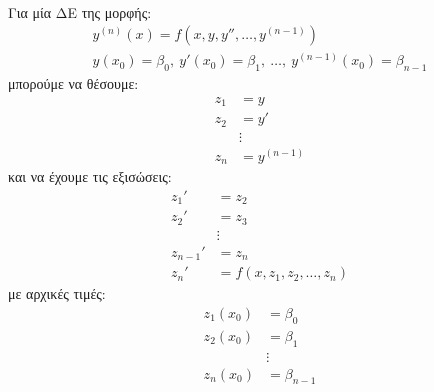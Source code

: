 \documentclass[11pt,a4paper,notitlepage,fleqn,final]{article}
\begin{document}
\paragraph{}
Για μία ΔΕ της μορφής:
\begin{gather*}
	y^{(n)}(x) = f\left(x,y,y'',\dots,y^{(n-1)}\right) \\
	y(x_0) = \beta_0,\ y'(x_0)=\beta_1,\ \dots,\ y^{(n-1)}(x_0)=
	\beta_{n-1}
\end{gather*}
μπορούμε να θέσουμε:
\begin{align*}
	z_1 &= y \\
	z_2 &= y' \\
	&\vdots \\
	z_n &= y^{(n-1)}
\end{align*}
και να έχουμε τις εξισώσεις:
\begin{align*}
	z_1' &= z_2 \\
	z_2' &= z_3 \\
	&\vdots \\
	z_{n-1}' &= z_n \\[3ex]
	z_n' &= f(x,z_1,z_2,\dots,z_n)
\end{align*}
με αρχικές τιμές:
\begin{align*}
	z_1(x_0) &= \beta_0 \\
	z_2(x_0) &= \beta_1 \\
	&\vdots \\
	z_n(x_0) &= \beta_{n-1}
\end{align*}
\end{document}
